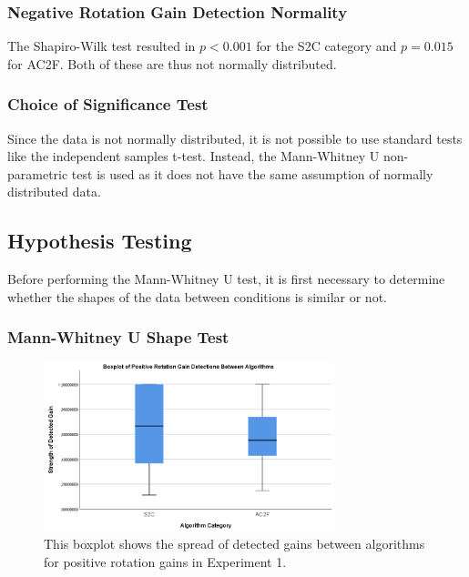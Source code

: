 \subsubsection{Negative Rotation Gain Detection Normality}
The Shapiro-Wilk test resulted in $p < 0.001$ for the S2C category and $p = 0.015$ for AC2F. Both of these are thus not normally distributed.  

\subsubsection{Choice of Significance Test}
Since the data is not normally distributed, it is not possible to use standard tests like the independent samples t-test. Instead, the Mann-Whitney U non-parametric test is used as it does not have the same assumption of normally distributed data. 
   
\subsection{Hypothesis Testing}
Before performing the Mann-Whitney U test, it is first necessary to determine whether the shapes of the data between conditions is similar or not. 
\subsubsection{Mann-Whitney U Shape Test}
\begin{figure}[tbph]
    \centering
    \includegraphics[width=0.75\textwidth]{figures/graphs/PosRotationDetectionBoxplot.png}
    \caption[Boxplot on Positive Rotation Detections in Experiment 1]{This boxplot shows the spread of detected gains between algorithms for positive rotation gains in Experiment 1.}
    \label{fig:posRotEx1Boxplot}
\end{figure}

